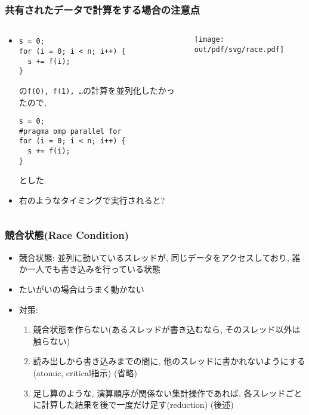 \documentclass[10pt,dvipdfmx]{beamer}
\newcommand{\ao}[1]{{\color{blue}#1}}
\newcommand{\aka}[1]{{\color{red}#1}}
\begin{document}
\begin{frame}[fragile]
  \frametitle{共有されたデータで計算をする場合の注意点}
  \begin{columns}
    \begin{column}{0.5\textwidth}
\begin{itemize}
\item []
\begin{lstlisting}
s = 0;
for (i = 0; i < n; i++) {
  s += f(i);
}
\end{lstlisting}
の\texttt{f(0), f(1), \ldots}の計算を並列化したかったので, 
\begin{lstlisting}
s = 0;
#pragma omp parallel for  
for (i = 0; i < n; i++) {
  s += f(i);
}
\end{lstlisting}
とした. 

\item 右のようなタイミングで実行されると?

\end{itemize}
    \end{column}
    \begin{column}{0.5\textwidth}
\begin{center}
\texttt{[image: out/pdf/svg/race.pdf]}    
\end{center}
    \end{column}
  \end{columns}
  
\end{frame}


\begin{frame}
  \frametitle{競合状態(Race Condition)}
  \begin{itemize}
  \item \aka{競合状態:} 並列に動いているスレッドが,
    同じデータをアクセスしており, 誰か一人でも書き込みを行っている状態
  \item \aka{たいがいの場合はうまく動かない}
  \item 対策:
    \begin{enumerate}
    \item 競合状態を作らない(あるスレッドが書き込むなら, そのスレッド以外は触らない)
    \item 読み出しから書き込みまでの間に, 他のスレッドに書かれないようにする
      (atomic, critical指示) (省略)
    \item 足し算のような, 演算順序が関係ない集計操作であれば,
      各スレッドごとに計算した結果を後で一度だけ足す(reduction) \ao{(後述)}
    \end{enumerate}
  \end{itemize}
\end{frame}
\end{document}
